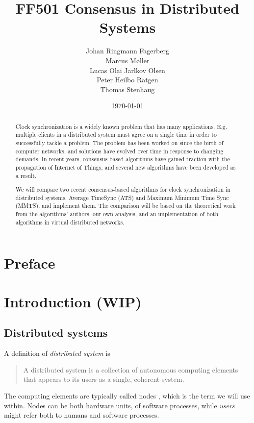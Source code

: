 \documentclass[a4paper,12pt]{article}
\date{\today}
\title{FF501 Consensus in Distributed Systems}
\author{
  Johan Ringmann Fagerberg \\
  Marcus Møller \\
  Lucas Olai Jarlkov Olsen \\
  Peter Heilbo Ratgen \\
  Thomas Stenhaug
}
\begin{document}
\maketitle

\setlength{\baselineskip}{1.44\baselineskip}

\begin{abstract}

Clock synchronization is a widely known problem that has many applications. E.g. multiple clients in a distributed system must agree on a single time in order to successfully tackle a problem. The problem has been worked on since the birth of computer networks, and solutions have evolved over time in response to changing demands. In recent years, consensus based algorithms have gained traction with the propagation of Internet of Things, and several new algorithms have been developed as a result.

We will compare two recent consensus-based algorithms for clock synchronization in distributed systems, Average TimeSync (ATS) and Maximum Minimum Time Sync (MMTS), and implement them. The comparison will be based on the theoretical work from the algorithms' authors, our own analysis, and an implementation of both algorithms in virtual distributed networks.
\end{abstract}

\clearpage
\tableofcontents
\clearpage

\setcounter{page}{1}

\section{Preface}

\section{Introduction (WIP)}

\subsection{Distributed systems}

A definition of \textit{distributed system} is
\begin{quote}
  A distributed system is a collection of autonomous computing
  elements that appears to its users as a single, coherent
  system.\cite{TanenbaumSteen06}
\end{quote}

The computing elements are typically called
nodes \cite{TanenbaumSteen06}, which is the term we will use within.
Nodes can be both hardware units, of software processes, while
\textit{users} might refer both to humans and software processes.
\end{document}

